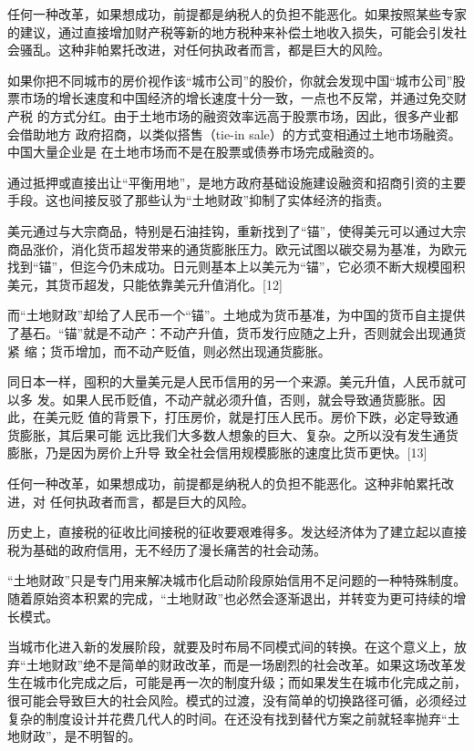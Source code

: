 任何一种改革，如果想成功，前提都是纳税人的负担不能恶化。如果按照某些专家的建议，通过直接增加财产税等新的地方税种来补偿土地收入损失，可能会引发社会骚乱。这种非帕累托改进，对任何执政者而言，都是巨大的风险。

如果你把不同城市的房价视作该“城市公司”的股价，你就会发现中国“城市公司”股
票市场的增长速度和中国经济的增长速度十分一致，一点也不反常，并通过免交财产税
的方式分红。由于土地市场的融资效率远高于股票市场，因此，很多产业都会借助地方
政府招商，以类似搭售（tie-in sale）的方式变相通过土地市场融资。中国大量企业是
在土地市场而不是在股票或债券市场完成融资的。

通过抵押或直接出让“平衡用地”，是地方政府基础设施建设融资和招商引资的主要手段。这也间接反驳了那些认为“土地财政”抑制了实体经济的指责。

美元通过与大宗商品，特别是石油挂钩，重新找到了“锚”，使得美元可以通过大宗商品涨价，消化货币超发带来的通货膨胀压力。欧元试图以碳交易为基准，为欧元找到“锚”，但迄今仍未成功。日元则基本上以美元为“锚”，它必须不断大规模囤积美元，其货币超发，只能依靠美元升值消化。[12]

而“土地财政”却给了人民币一个“锚”。土地成为货币基准，为中国的货币自主提供
了基石。“锚”就是不动产：不动产升值，货币发行应随之上升，否则就会出现通货紧
缩；货币增加，而不动产贬值，则必然出现通货膨胀。

同日本一样，囤积的大量美元是人民币信用的另一个来源。美元升值，人民币就可以多
发。如果人民币贬值，不动产就必须升值，否则，就会导致通货膨胀。因此，在美元贬
值的背景下，打压房价，就是打压人民币。房价下跌，必定导致通货膨胀，其后果可能
远比我们大多数人想象的巨大、复杂。之所以没有发生通货膨胀，乃是因为房价上升导
致全社会信用规模膨胀的速度比货币更快。[13]

任何一种改革，如果想成功，前提都是纳税人的负担不能恶化。这种非帕累托改进，对
任何执政者而言，都是巨大的风险。

历史上，直接税的征收比间接税的征收要艰难得多。发达经济体为了建立起以直接税为基础的政府信用，无不经历了漫长痛苦的社会动荡。

“土地财政”只是专门用来解决城市化启动阶段原始信用不足问题的一种特殊制度。随着原始资本积累的完成，“土地财政”也必然会逐渐退出，并转变为更可持续的增长模式。

当城市化进入新的发展阶段，就要及时布局不同模式间的转换。在这个意义上，放弃“土地财政”绝不是简单的财政改革，而是一场剧烈的社会改革。如果这场改革发生在城市化完成之后，可能是再一次的制度升级；而如果发生在城市化完成之前，很可能会导致巨大的社会风险。模式的过渡，没有简单的切换路径可循，必须经过复杂的制度设计并花费几代人的时间。在还没有找到替代方案之前就轻率抛弃“土地财政”，是不明智的。

